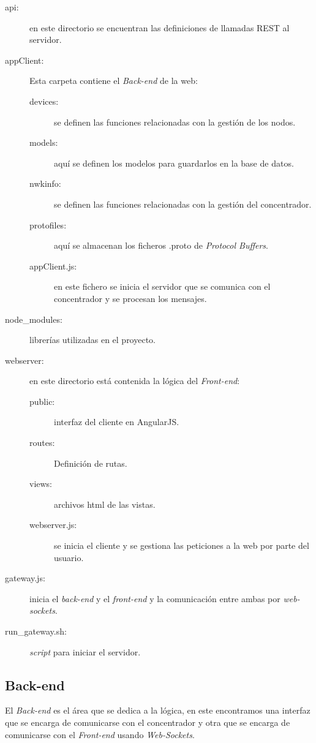 \begin{description}
	\item[api: ] en este directorio se encuentran las definiciones de llamadas REST al servidor.
	\item[appClient: ] Esta carpeta contiene el \textit{Back-end} de la web:
	\begin{description}
		\item[devices: ] se definen las funciones relacionadas con la gestión de los nodos.
		\item[models: ] aquí se definen los modelos para guardarlos en la base de datos.
		\item[nwkinfo: ] se definen las funciones relacionadas con la gestión del concentrador.
		\item[protofiles: ] aquí se almacenan los ficheros .proto de \textit{Protocol Buffers}.
		\item[appClient.js: ] en este fichero se inicia el servidor que se comunica con el concentrador y se procesan los mensajes.
	\end{description}
	\item[node\_modules: ] librerías utilizadas en el proyecto.
	\item[webserver: ] en este directorio está contenida la lógica del \textit{Front-end}:
	\begin{description}
		\item[public: ] interfaz del cliente en AngularJS.
		\item[routes: ] Definición de rutas.
		\item[views: ] archivos html de las vistas.
		\item[webserver.js: ] se inicia el cliente y se gestiona las peticiones a la web por parte del usuario.
	\end{description}
	\item[gateway.js: ] inicia el \textit{back-end} y el \textit{front-end} y la comunicación entre ambas por \textit{web-sockets}.
	\item[run\_gateway.sh: ] \textit{script} para iniciar el servidor.
\end{description}

\subsection*{Back-end}

El \textit{Back-end} es el área que se dedica a la lógica, en este encontramos una interfaz que se encarga de comunicarse con el concentrador y otra que se encarga de comunicarse con el \textit{Front-end} usando \textit{Web-Sockets}.


